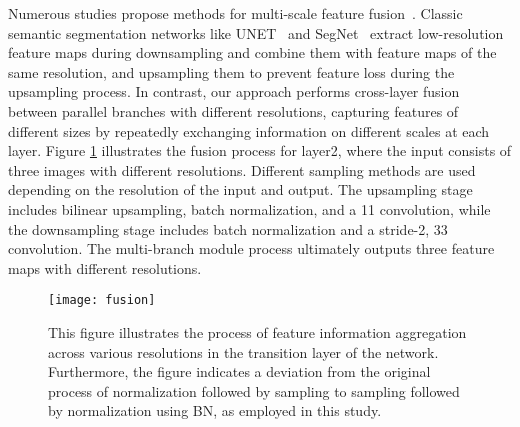 \documentclass[journal]{IEEEtran}
\begin{document}
Numerous studies propose methods for multi-scale feature fusion~\cite{long2015fully,cheng2020higherhrnet,zhang2019multi}. Classic semantic segmentation networks like UNET~\cite{ronneberger2015u} and SegNet~\cite{badrinarayanan2017segnet} extract low-resolution feature maps during downsampling and combine them with feature maps of the same resolution, and upsampling them to prevent feature loss during the upsampling process. In contrast, our approach performs cross-layer fusion between parallel branches with different resolutions, capturing features of different sizes by repeatedly exchanging information on different scales at each layer. Figure \ref{fig:fusion} illustrates the fusion process for layer2, where the input consists of three images with different resolutions. Different sampling methods are used depending on the resolution of the input and output. The upsampling stage includes bilinear upsampling, batch normalization, and a 11 convolution, while the downsampling stage includes batch normalization and a stride-2, 33 convolution. The multi-branch module  process ultimately outputs three feature maps with different resolutions.


\begin{figure}[!ht]
    \centering
    \texttt{[image: fusion]}
    \caption{This figure illustrates the process of feature information aggregation across various resolutions in the transition layer of the network. Furthermore, the figure indicates a deviation from the original process of normalization followed by sampling to sampling followed by normalization using BN, as employed in this study.}
    \label{fig:fusion}
\end{figure}
\end{document}
